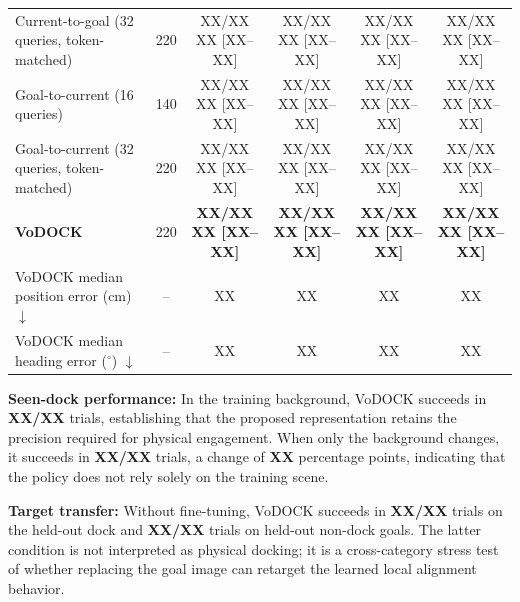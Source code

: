 \documentclass[letterpaper, 10 pt, conference]{IEEEtran}  %
\begin{document}
\begin{table}[!t]
{\begin{tabular}{@{}lccccc@{}}
Current-to-goal (32 queries, token-matched)  & 220 & \shortstack{XX/XX\\XX [XX--XX]} & \shortstack{XX/XX\\XX [XX--XX]} & \shortstack{XX/XX\\XX [XX--XX]} & \shortstack{XX/XX\\XX [XX--XX]} \\
Goal-to-current (16 queries)                 & 140 & \shortstack{XX/XX\\XX [XX--XX]} & \shortstack{XX/XX\\XX [XX--XX]} & \shortstack{XX/XX\\XX [XX--XX]} & \shortstack{XX/XX\\XX [XX--XX]} \\
Goal-to-current (32 queries, token-matched)  & 220 & \shortstack{XX/XX\\XX [XX--XX]} & \shortstack{XX/XX\\XX [XX--XX]} & \shortstack{XX/XX\\XX [XX--XX]} & \shortstack{XX/XX\\XX [XX--XX]} \\
\textbf{VoDOCK}                              & 220 & \shortstack{\textbf{XX/XX}\\\textbf{XX [XX--XX]}} & \shortstack{\textbf{XX/XX}\\\textbf{XX [XX--XX]}} & \shortstack{\textbf{XX/XX}\\\textbf{XX [XX--XX]}} & \shortstack{\textbf{XX/XX}\\\textbf{XX [XX--XX]}} \\
\midrule
VoDOCK median position error (cm) $\downarrow$      & -- & XX & XX & XX & XX \\
VoDOCK median heading error ($^\circ$) $\downarrow$ & -- & XX & XX & XX & XX \\
\bottomrule
\end{tabular}%
}
\end{table}

\textbf{Seen-dock performance:}
In the training background, VoDOCK succeeds in \textbf{XX/XX} trials, establishing that the proposed representation retains the precision required for physical engagement. When only the background changes, it succeeds in \textbf{XX/XX} trials, a change of \textbf{XX} percentage points, indicating that the policy does not rely solely on the training scene.

\textbf{Target transfer:}
Without fine-tuning, VoDOCK succeeds in \textbf{XX/XX} trials on the held-out dock and \textbf{XX/XX} trials on held-out non-dock goals. The latter condition is not interpreted as physical docking; it is a cross-category stress test of whether replacing the goal image can retarget the learned local alignment behavior.
\end{document}
